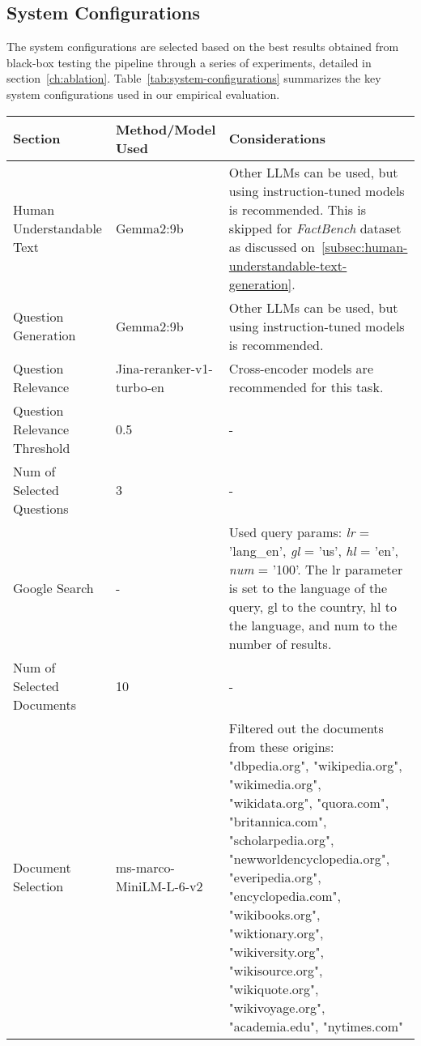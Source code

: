\subsection{System Configurations}\label{subsec:empirical-evaluation:experimental-setup:system-configurations}
The system configurations are selected based on the best results obtained from black-box testing the pipeline through a series of experiments, detailed in section~\ref{ch:ablation}.
Table~\ref{tab:system-configurations} summarizes the key system configurations used in our empirical evaluation.

{
    \noindent
    \centering
    \footnotesize
    \begin{tabularx}{\linewidth}{XXX}
        \toprule
        \textbf{Section} & \textbf{Method/Model Used} & \textbf{Considerations} \\
        \midrule
        Human Understandable Text & Gemma2:9b & Other LLMs can be used, but using instruction-tuned models is recommended. This is skipped for \textit{FactBench} dataset as discussed on~\ref{subsec:human-understandable-text-generation}. \\
        \hline
        Question Generation & Gemma2:9b & Other LLMs can be used, but using instruction-tuned models is recommended. \\
        \hline
        Question Relevance & Jina-reranker-v1-turbo-en & Cross-encoder models are recommended for this task. \\
        \hline
        Question Relevance Threshold & 0.5 & - \\
        \hline
        Num of Selected Questions & 3 & - \\
        \hline
        Google Search & - & Used query params: \textit{lr} = 'lang\_en', \textit{gl} = 'us', \textit{hl} = 'en', \textit{num} = '100'. The lr parameter is set to the language of the query, gl to the country, hl to the language, and num to the number of results. \\
        \hline
        Num of Selected Documents & 10 & - \\
        \hline
        Document Selection & ms-marco-MiniLM-L-6-v2 & Filtered out the documents from these origins: "dbpedia.org", "wikipedia.org", "wikimedia.org", "wikidata.org", "quora.com", "britannica.com", "scholarpedia.org", "newworldencyclopedia.org", "everipedia.org", "encyclopedia.com", "wikibooks.org", "wiktionary.org", "wikiversity.org", "wikisource.org", "wikiquote.org", "wikivoyage.org", "academia.edu", "nytimes.com" \\

\end{tabularx}}
